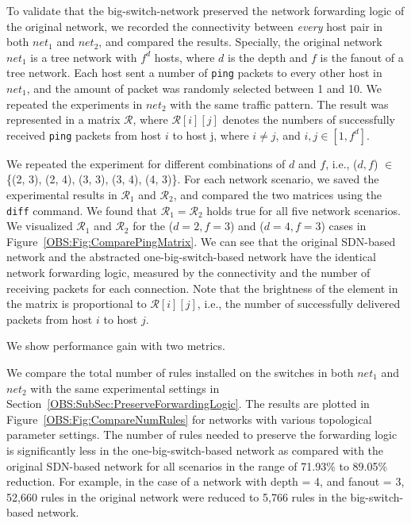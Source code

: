 To validate that the big-switch-network preserved the network forwarding logic of the original network,
we recorded the connectivity between \emph{every} host pair in both $net_1$ and $net_2$,
and compared the results.
Specially, the original network $net_1$ is a tree network with $f^d$ hosts,
where $d$ is the depth and $f$ is the fanout of a tree network.
Each host sent a number of \texttt{ping} packets to every other host in $net_1$,
and the amount of packet was randomly selected between 1 and 10.
We repeated the experiments in $net_2$ with the same traffic pattern.
The result was represented in a matrix $\mathcal{R}$,
where $\mathcal{R}[i][j]$ denotes the numbers of successfully received \texttt{ping}
packets from host $i$ to host j, where $i \neq j$, and $i, j \in [1, f^d]$.


We repeated the experiment for different combinations of $d$ and $f$, i.e., ($d, f$) $\in$
\{(2, 3), (2, 4), (3, 3), (3, 4), (4, 3)\}. For each network scenario,
we saved the experimental results in $\mathcal{R}_1$ and $\mathcal{R}_2$, and compared the two matrices using the \texttt{diff} command.
We found that $\mathcal{R}_1 = \mathcal{R}_2$ holds true for all five network scenarios.
We visualized $\mathcal{R}_1$ and $\mathcal{R}_2$ for the ($d=2, f=3$) and ($d=4, f=3$) cases
in Figure~\ref{OBS:Fig:ComparePingMatrix}.
We can see that the original SDN-based network and the abstracted one-big-switch-based
network have the identical network forwarding logic,
measured by the connectivity and the number of receiving packets for each connection.
Note that the brightness of the element in the matrix is proportional to $\mathcal{R}[i][j]$,
i.e., the number of successfully delivered packets from host $i$ to host $j$.

We show performance gain with two metrics.

 We compare the total number of rules installed
on the switches in both $net_1$ and $net_2$ with the same experimental settings
in Section~\ref{OBS:SubSec:PreserveForwardingLogic}.
The results are plotted in Figure~\ref{OBS:Fig:CompareNumRules} for networks with
various topological parameter settings.
The number of rules needed to preserve the forwarding logic is significantly
less in the one-big-switch-based network as compared with the original SDN-based network
for all scenarios in the range of 71.93\% to 89.05\% reduction.
For example, in the case of a network with depth = 4, and fanout = 3, 52,660 rules
in the original network were reduced to 5,766 rules in the big-switch-based network.


